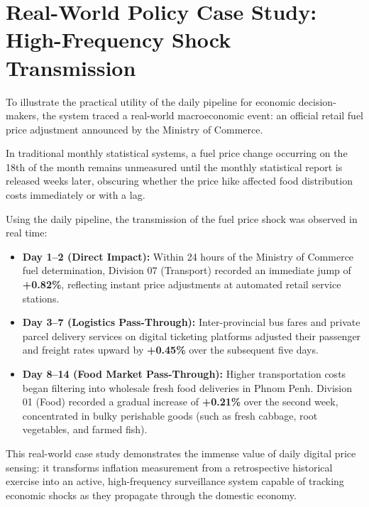 \section{Real-World Policy Case Study: High-Frequency Shock Transmission}
\hs To illustrate the practical utility of the daily pipeline for economic decision-makers, the system traced a real-world macroeconomic event: an official retail fuel price adjustment announced by the Ministry of Commerce.

\hs In traditional monthly statistical systems, a fuel price change occurring on the 18th of the month remains unmeasured until the monthly statistical report is released weeks later, obscuring whether the price hike affected food distribution costs immediately or with a lag.

\hs Using the daily pipeline, the transmission of the fuel price shock was observed in real time:
\begin{itemize}
    \item \textbf{Day 1--2 (Direct Impact):} Within 24 hours of the Ministry of Commerce fuel determination, Division 07 (Transport) recorded an immediate jump of \textbf{+0.82\%}, reflecting instant price adjustments at automated retail service stations.
    \item \textbf{Day 3--7 (Logistics Pass-Through):} Inter-provincial bus fares and private parcel delivery services on digital ticketing platforms adjusted their passenger and freight rates upward by \textbf{+0.45\%} over the subsequent five days.
    \item \textbf{Day 8--14 (Food Market Pass-Through):} Higher transportation costs began filtering into wholesale fresh food deliveries in Phnom Penh. Division 01 (Food) recorded a gradual increase of \textbf{+0.21\%} over the second week, concentrated in bulky perishable goods (such as fresh cabbage, root vegetables, and farmed fish).
\end{itemize}
This real-world case study demonstrates the immense value of daily digital price sensing: it transforms inflation measurement from a retrospective historical exercise into an active, high-frequency surveillance system capable of tracking economic shocks as they propagate through the domestic economy.

